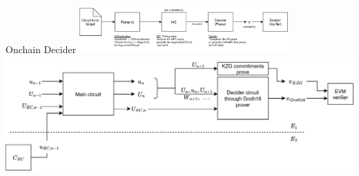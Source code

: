 \documentclass[t]{beamer} \usefonttheme[onlymath]{serif}
\begin{document}
\begin{frame}{Onchain Decider}
  \includegraphics[width=8cm]{folding-scheme-pipeline-without-augmentedfcircuit}
  \pause
  \includegraphics[width=\textwidth]{decider-onchain-flow-diagram}
\end{frame}
\end{document}
